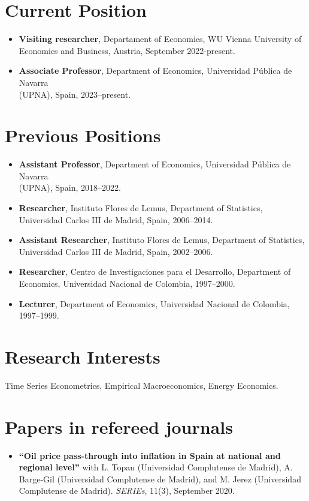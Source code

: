 \documentclass[11pt]{article}\usepackage[]{graphicx}\usepackage[usenames,dvipsnames]{xcolor}
\begin{document}
{%
\section{Current Position} 
\begin{itemize}
\item\textbf{Visiting researcher}, Departament of Economics, WU Vienna University of Economics and Business, Austria, September 2022-present.\\
\item\textbf{Associate Professor}, Department of Economics, Universidad Pública de Navarra\\ (UPNA), Spain, 2023--present.\\
\end{itemize}

\section{Previous Positions} 
\begin{itemize}
  \item\textbf{Assistant Professor}, Department of Economics, Universidad Pública de Navarra\\ (UPNA), Spain, 2018--2022.
  \item \textbf{Researcher}, Instituto Flores de Lemus, Department of Statistics, Universidad Carlos III de Madrid, Spain, 2006--2014.
  \item \textbf{Assistant Researcher}, Instituto Flores de Lemus, Department of Statistics, Universidad Carlos III de Madrid, Spain, 2002--2006.
  \item \textbf{Researcher}, Centro de Investigaciones para el Desarrollo, Department of Economics, Universidad Nacional de Colombia, 1997--2000.
  \item \textbf{Lecturer}, Department of Economics, Universidad Nacional de Colombia, 1997--1999.
\end{itemize}

\section{Research Interests}
Time Series Econometrics, Empirical Macroeconomics, Energy Economics.\\

\section{Papers in refereed journals}
\begin{itemize}
  \item \textbf{``Oil price pass-through into inflation in Spain at national and regional level''} with L. Topan (Universidad Complutense de Madrid), A. Barge-Gil (Universidad Complutense de Madrid), and M. Jerez (Universidad Complutense de Madrid). \emph{SERIEs}, 11(3), September 2020.


\end{itemize}}
\end{document}
